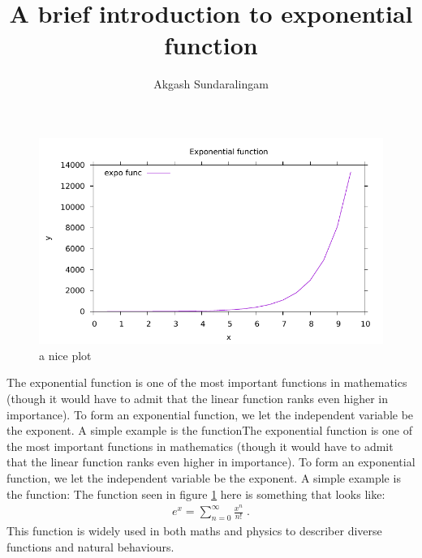 \documentclass{article}
\title{A brief introduction to exponential function}
\author{Akgash Sundaralingam}
\date{}
\begin{document}
\maketitle
\begin{figure}[ht!]
    \centering
    \includegraphics[width=\textwidth]{exp1.pdf}
    \caption{a nice plot}
    \label{fig:exp}
\end{figure}


The exponential function is one of the most important functions in mathematics (though it would have to admit that the linear function ranks even higher in importance). To form an exponential function, we let the independent variable be the exponent. A simple example is the functionThe exponential function is one of the most important functions in mathematics (though it would have to admit that the linear function ranks even higher in importance). To form an exponential function, we let the independent variable be the exponent. A simple example is the function:
The function seen in figure \ref{fig:exp} here is something that looks like: 
\begin{align}
e^x=\sum^{\infty}_{n=0} \frac{x^n}{n!} \label{Taylor_exp} \; . 
\end{align}
This function is widely used in both maths and physics to describer diverse functions and natural behaviours. 
\newpage
\end{document}
